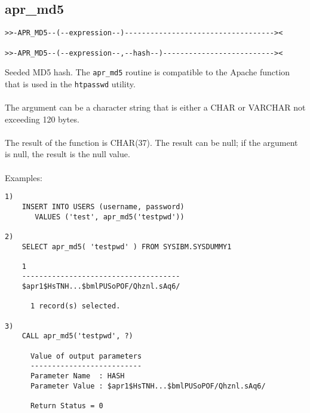 \subsection{apr\_md5} \label{aprmd5}
\begin{verbatim}
>>-APR_MD5--(--expression--)-----------------------------------><

>>-APR_MD5--(--expression--,--hash--)--------------------------><
\end{verbatim}
Seeded MD5 hash. The {\tt apr\_md5} routine is compatible to the Apache function that is used in the {\tt htpasswd} utility.\\
\\
The argument can be a character string that is either a \mbox{CHAR} or \mbox{VARCHAR} not exceeding 120 bytes.\\
\\
The result of the function is CHAR(37). The result can be null; if the argument is null, the result is the null value.\\
\\
Examples:
\begin{verbatim}
1)
    INSERT INTO USERS (username, password)
       VALUES ('test', apr_md5('testpwd'))

2)
    SELECT apr_md5( 'testpwd' ) FROM SYSIBM.SYSDUMMY1

    1
    -------------------------------------
    $apr1$HsTNH...$bmlPUSoPOF/Qhznl.sAq6/

      1 record(s) selected.

3)
    CALL apr_md5('testpwd', ?)

      Value of output parameters
      --------------------------
      Parameter Name  : HASH
      Parameter Value : $apr1$HsTNH...$bmlPUSoPOF/Qhznl.sAq6/

      Return Status = 0
\end{verbatim}
\newpage
\hypertarget{haprcrypt}{}

